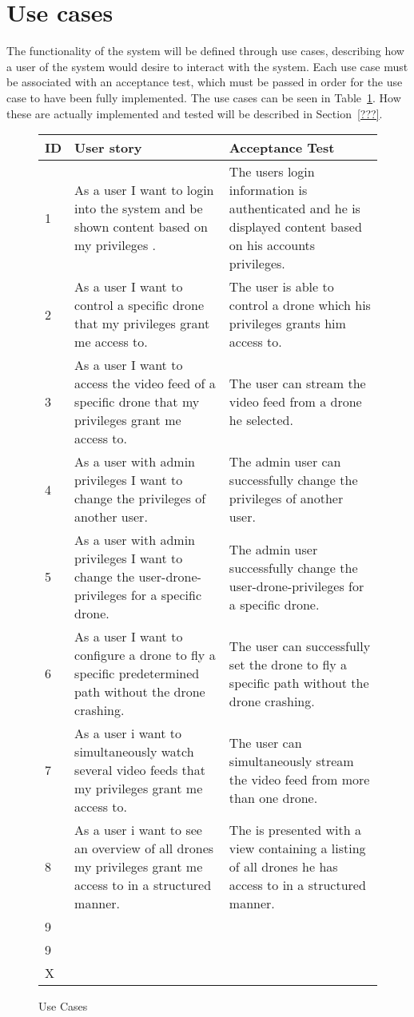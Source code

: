 \section{Use cases}
The functionality of the system will be defined through use cases, describing how a user of the system would desire to interact with the system.
Each use case must be associated with an acceptance test, which must be passed in order for the use case to have been fully implemented.
The use cases can be seen in Table~\ref{tab:use_cases}.
How these are actually implemented and tested will be described in Section~\ref{???}.

\begin{figure}[H]
\begin{center}
\begin{tabular}{ | l | p{6cm} | p{6cm} | }
  \hline              
	\textbf{ID} & \textbf{User story} & \textbf{Acceptance Test} \\ \hline
	1 & As a user I want to login into the system and be shown content based on my privileges .& The users login information is authenticated and he is displayed content based on his accounts privileges.\\ \hline
	2 & As a user I want to control a specific drone that my privileges grant me access to. & The user is able to control a drone which his privileges grants him access to. \\ \hline
	3 & As a user I want to access the video feed of a specific drone that my privileges grant me access to. & The user can stream the video feed from a drone he selected.\\ \hline
	4 & As a user with admin privileges I want to change the privileges of another user. & The admin user can successfully change the privileges of another user. \\ \hline
	5 & As a user with admin privileges I want to change the user-drone-privileges for a specific drone. & The admin user successfully change the user-drone-privileges for a specific drone. \\ \hline
	6 & As a user I want to configure a drone to fly a specific predetermined path without the drone crashing. & The user can successfully set the drone to fly a specific path without the drone crashing. \\ \hline
	7 & As a user i want to simultaneously watch several video feeds that my privileges grant me access to. & The user can simultaneously stream the video feed from more than one drone. \\ \hline
	8 & As a user i want to see an overview of all drones my privileges grant me access to in a structured manner. &  The is presented with a view containing a listing of all drones he has access to in a structured manner.\\ \hline
	9 & &  \\ \hline
	9 & &  \\ \hline
	X & &  \\ 
  \hline  
\end{tabular}

\caption{Use Cases}
\label{tab:use_cases}
\end{center}
\end{figure}